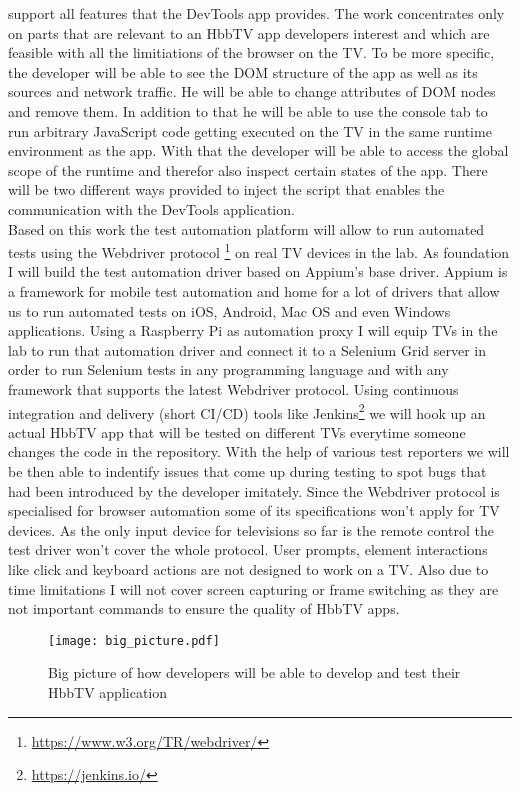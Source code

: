 support all features that the DevTools app provides. The work concentrates only on parts that are relevant to
an HbbTV app developers interest and which are feasible with all the limitiations of the browser on the TV.
To be more specific, the developer will be able to see the DOM structure of the app as well as its sources and
network traffic. He will be able to change attributes of DOM nodes and remove them. In addition to that he will
be able to use the console tab to run arbitrary JavaScript code getting executed on the TV in the same runtime
environment as the app. With that the developer will be able to access the global scope of the runtime and therefor
also inspect certain states of the app. There will be two different ways provided to inject the script that
enables the communication with the DevTools application.\\
Based on this work the test automation platform will allow to run automated tests using the Webdriver protocol
\footnote{\url{https://www.w3.org/TR/webdriver/}} on real TV devices in the lab. As foundation I will build the
test automation driver based on Appium's base driver. Appium is a framework for mobile test automation and home
for a lot of drivers that allow us to run automated tests on iOS, Android, Mac OS and even Windows applications.
Using a Raspberry Pi as automation proxy I will equip TVs in the lab to run that automation driver and connect
it to a Selenium Grid server in order to run Selenium tests in any programming language and with any framework
that supports the latest Webdriver protocol. Using continuous integration and delivery (short CI/CD) tools like
Jenkins\footnote{\url{https://jenkins.io/}} we will hook up an actual HbbTV app that will be tested on different
TVs everytime someone changes the code in the repository. With the help of various test reporters we will be then
able to indentify issues that come up during testing to spot bugs that had been introduced by the developer
imitately. Since the Webdriver protocol is specialised for browser automation some of its specifications won't
apply for TV devices. As the only input device for televisions so far is the remote control the test driver won't
cover the whole protocol. User prompts, element interactions like click and keyboard actions are not designed
to work on a TV. Also due to time limitations I will not cover screen capturing or frame switching as they are
not important commands to ensure the quality of HbbTV apps.

\begin{figure}[htb]
  \centering
  \texttt{[image: big\_picture.pdf]}\\
  \caption{Big picture of how developers will be able to develop and test their HbbTV application}\label{fig:bigpicture}
\end{figure}

